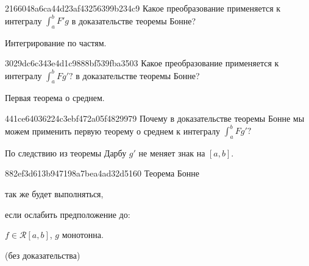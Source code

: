 \begin{note}{2166048a6ca44d23af43256399b234c9}
    Какое преобразование применяется к интегралу \({ \int_{a}^{b} F' g }\) в доказательстве теоремы Бонне?

    \begin{cloze}{1}
        Интегрирование по частям.
    \end{cloze}
\end{note}

\begin{note}{3029dc6c343e4d1c9888bf539fba3503}
    Какое преобразование применяется к интегралу \({ \int_{a}^{b} Fg'? }\) в доказательстве теоремы Бонне?

    \begin{cloze}{1}
        Первая теорема о среднем.
    \end{cloze}
\end{note}

\begin{note}{441ce64036224c3ebf472a05f4829979}
    Почему в доказательстве теоремы Бонне мы можем применить первую теорему о среднем к интегралу \({ \int_{a}^{b} Fg'? }\)

    \begin{cloze}{1}
        По следствию из теоремы Дарбу \({ g' }\) не меняет знак на \({ [a, b] }\).
    \end{cloze}
\end{note}

\begin{note}{882ef3d613b947198a7bea4ad32d5160}
    Теорема Бонне \begin{icloze}{2}так же будет выполняться,\end{icloze} если ослабить предположение до:
    \begin{icloze}{1}
        \begin{center}
            \({ f \in \mathcal R[a, b] }\),\: \({ g }\) монотонна.
        \end{center}
    \end{icloze}

    \begin{center}
        \tiny
        (без доказательства)
    \end{center}
\end{note}

